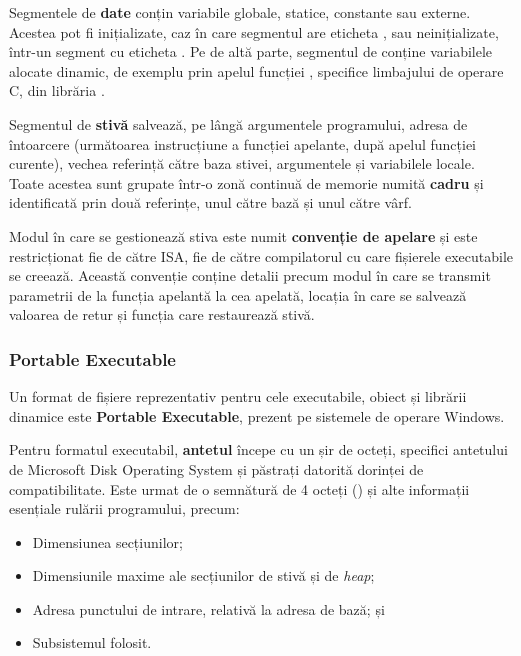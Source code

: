 \documentclass[../../main.tex]{subfiles}
\begin{document}
Segmentele de \textbf{date} conțin variabile globale, statice, constante sau externe. Acestea pot fi inițializate, caz în care segmentul are eticheta , sau neinițiali\-zate, într-un segment cu eticheta . Pe de altă parte, segmentul de  conține variabilele alocate dinamic, de exemplu prin apelul funcției , specifice limbajului de operare C, din librăria .

Segmentul de \textbf{stivă} salvează, pe lângă argumentele programului, adresa de întoarcere (următoarea instrucțiune a funcției apelante, după apelul funcției curente), vechea referință către baza stivei, argumentele și variabilele locale. Toate acestea sunt grupate într-o zonă continuă de memorie numită \textbf{cadru} și identificată prin două referințe, unul către bază și unul către vârf.

Modul în care se gestionează stiva este numit \textbf{convenție de apelare} și este restricționat fie de către ISA, fie de către compilatorul cu care fișierele executabile se creează. Această convenție conține detalii precum modul în care se transmit parametrii de la funcția apelantă la cea apelată, locația în care se salvează valoarea de retur și funcția care restaurează stivă.

\subsubsection{Portable Executable}

Un format de fișiere reprezentativ pentru cele executabile, obiect și librării dinamice este \textbf{Portable Executable}, prezent pe sistemele de operare Windows.

Pentru formatul executabil, \textbf{antetul} începe cu un șir de octeți, specifici antetului de Microsoft Disk Operating System și păstrați datorită dorinței de compatibilitate. Este urmat de o semnătură de 4 octeți () și alte informații esențiale rulării programului, precum:
\begin{itemize}
    \item Dimensiunea secțiunilor;
    \item Dimensiunile maxime ale secțiunilor de stivă și de \textit{heap};
    \item Adresa punctului de intrare, relativă la adresa de bază; și
    \item Subsistemul folosit.
\end{itemize}
\end{document}
